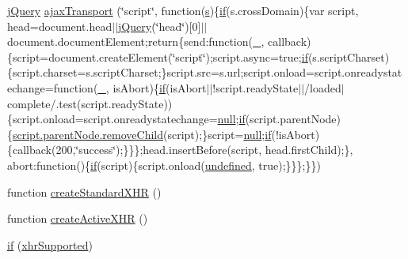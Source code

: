 \begin{DoxyCompactItemize}
\hyperlink{_site_bundle_2_resources_2public_2js_2_specific_functions_8js_ada154f66b5b2b806f5e239376e925644}{j\+Query} \hyperlink{jquery-1_89_81_8js_aa4b3cc72f61c03cca7a223e4c552f80f}{ajax\+Transport} (\char`\"{}script\char`\"{}, function(\hyperlink{validate_8js_ae059f217efaf1d50696a1214c3ce5748}{s})\{\hyperlink{fullpage_2plugin_8js_a8b98017e64ef036adb9ae327ff94abe1}{if}(s.\+cross\+Domain)\{var script, head=document.\+head$\vert$$\vert$\hyperlink{_site_bundle_2_resources_2public_2js_2_specific_functions_8js_ada154f66b5b2b806f5e239376e925644}{j\+Query}(\char`\"{}head\char`\"{})\mbox{[}0\mbox{]}$\vert$$\vert$document.\+document\+Element;return\{send\+:function(\hyperlink{api_8methods_8js_a9fa21cf6b20968a71a2ed8acf4954e9e}{\+\_\+}, callback)\{script=document.\+create\+Element(\char`\"{}script\char`\"{});script.\+async=true;\hyperlink{fullpage_2plugin_8js_a8b98017e64ef036adb9ae327ff94abe1}{if}(s.\+script\+Charset)\{script.\+charset=s.\+script\+Charset;\}script.\+src=s.\+url;script.\+onload=script.\+onreadystatechange=function(\hyperlink{api_8methods_8js_a9fa21cf6b20968a71a2ed8acf4954e9e}{\+\_\+}, is\+Abort)\{\hyperlink{fullpage_2plugin_8js_a8b98017e64ef036adb9ae327ff94abe1}{if}(is\+Abort$\vert$$\vert$!script.\+ready\+State$\vert$$\vert$/loaded$\vert$complete/.test(script.\+ready\+State))\{script.\+onload=script.\+onreadystatechange=\hyperlink{validate_8js_afb8e110345c45e74478894341ab6b28e}{null};\hyperlink{fullpage_2plugin_8js_a8b98017e64ef036adb9ae327ff94abe1}{if}(script.\+parent\+Node)\{\hyperlink{jquery-ui_8js_ab13208bd0b29533656fdd9fdfc2de509}{script.\+parent\+Node.\+remove\+Child}(script);\}script=\hyperlink{validate_8js_afb8e110345c45e74478894341ab6b28e}{null};\hyperlink{fullpage_2plugin_8js_a8b98017e64ef036adb9ae327ff94abe1}{if}(!is\+Abort)\{callback(200,\char`\"{}success\char`\"{});\}\}\};head.\+insert\+Before(script, head.\+first\+Child);\}, abort\+:function()\{\hyperlink{fullpage_2plugin_8js_a8b98017e64ef036adb9ae327ff94abe1}{if}(script)\{script.\+onload(\hyperlink{tinymce_8js_a08113a236cc18d2a9d5ce27e638012be}{undefined}, true);\}\}\};\}\})
\item 
function \hyperlink{jquery-1_89_81_8js_acea019a8b67e4d114deb75d1e0b3474a}{create\+Standard\+X\+H\+R} ()
\item 
function \hyperlink{jquery-1_89_81_8js_a54bf63f1b5f905292db45a1d6a9dc300}{create\+Active\+X\+H\+R} ()
\item 
\hyperlink{jquery-1_89_81_8js_ae2dd433d7bb020adf83db5351a0671e1}{if} (\hyperlink{jquery-1_89_81_8js_afd7e72f2f357a5a8b17e46776a6283eb}{xhr\+Supported})
\item 

\end{DoxyCompactItemize}
